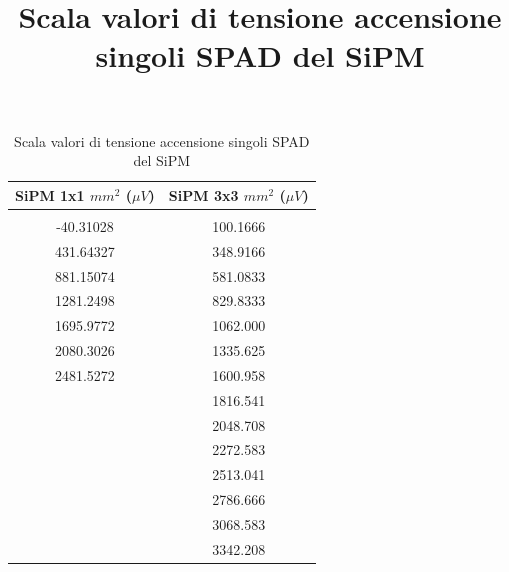 \documentclass[journal]{IEEEtran}
\begin{document}
\begin{table}[H]
    \centering
    \title{Scala valori di tensione accensione singoli SPAD del SiPM}
    \begin{tabular}{c|c}
    SiPM 1x1 $mm^2$ ($\mu V$)     &  SiPM 3x3 $mm^2$ ($\mu V$) \\
    \hline \\
         -40.31028 & 100.1666\\ 
         431.64327 & 348.9166\\ 
         881.15074 & 581.0833\\ 
         1281.2498 & 829.8333\\ 
         1695.9772 & 1062.000\\ 
         2080.3026 & 1335.625\\ 
         2481.5272 & 1600.958\\ 
                   & 1816.541\\ 
                   & 2048.708\\ 
                   & 2272.583\\ 
                   & 2513.041\\ 
                   & 2786.666\\ 
                   & 3068.583\\ 
                   & 3342.208\\
                
    \end{tabular}
    \vspace{5 mm}
    \caption{Scala valori di tensione accensione singoli SPAD del SiPM}
    \label{tab:SiPMscale}
\end{table}

\tableofcontents

\printbibliography
\end{document}
